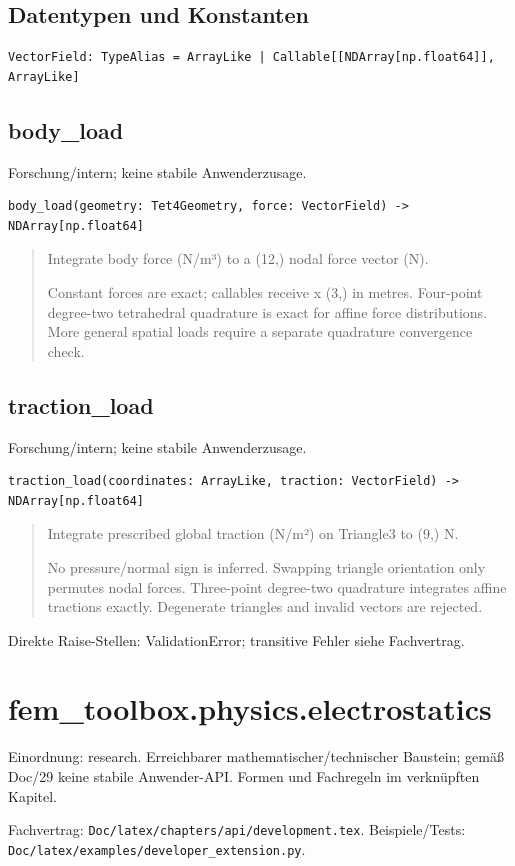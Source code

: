 \subsection*{Datentypen und Konstanten}
\begin{lstlisting}
VectorField: TypeAlias = ArrayLike | Callable[[NDArray[np.float64]], ArrayLike]
\end{lstlisting}
\subsection{body\_load}
Forschung/intern; keine stabile Anwenderzusage.
\begin{lstlisting}
body_load(geometry: Tet4Geometry, force: VectorField) -> NDArray[np.float64]
\end{lstlisting}
\begin{quote}
Integrate body force (N/m³) to a (12,) nodal force vector (N).\par Constant forces are exact; callables receive x (3,) in metres. Four-point degree-two tetrahedral quadrature is exact for affine force distributions. More general spatial loads require a separate quadrature convergence check.
\end{quote}
\subsection{traction\_load}
Forschung/intern; keine stabile Anwenderzusage.
\begin{lstlisting}
traction_load(coordinates: ArrayLike, traction: VectorField) -> NDArray[np.float64]
\end{lstlisting}
\begin{quote}
Integrate prescribed global traction (N/m²) on Triangle3 to (9,) N.\par No pressure/normal sign is inferred. Swapping triangle orientation only permutes nodal forces. Three-point degree-two quadrature integrates affine tractions exactly. Degenerate triangles and invalid vectors are rejected.
\end{quote}
Direkte Raise-Stellen: ValidationError; transitive Fehler siehe Fachvertrag.
\section{fem\_toolbox.physics.electrostatics}
Einordnung: research. Erreichbarer mathematischer/technischer Baustein; gemäß Doc/29 keine stabile Anwender-API. Formen und Fachregeln im verknüpften Kapitel.
\par Fachvertrag: \nolinkurl{Doc/latex/chapters/api/development.tex}. Beispiele/Tests:
\nolinkurl{Doc/latex/examples/developer_extension.py}.
